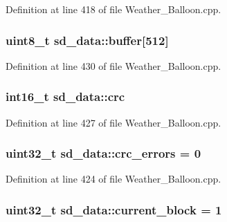 Definition at line 418 of file Weather\+\_\+\+Balloon.\+cpp.

\subsubsection[{\texorpdfstring{buffer}{buffer}}]{\setlength{\rightskip}{0pt plus 5cm}uint8\+\_\+t sd\+\_\+data\+::buffer\mbox{[}512\mbox{]}}\hypertarget{structsd__data_ab3590a9446d96dd2d7527a8b69d6a7e4}{}\label{structsd__data_ab3590a9446d96dd2d7527a8b69d6a7e4}


Definition at line 430 of file Weather\+\_\+\+Balloon.\+cpp.

\subsubsection[{\texorpdfstring{crc}{crc}}]{\setlength{\rightskip}{0pt plus 5cm}int16\+\_\+t sd\+\_\+data\+::crc}\hypertarget{structsd__data_a3e3831d75c0cbbc4f4bc83f20c57c4d7}{}\label{structsd__data_a3e3831d75c0cbbc4f4bc83f20c57c4d7}


Definition at line 427 of file Weather\+\_\+\+Balloon.\+cpp.

\subsubsection[{\texorpdfstring{crc\+\_\+errors}{crc\_errors}}]{\setlength{\rightskip}{0pt plus 5cm}uint32\+\_\+t sd\+\_\+data\+::crc\+\_\+errors = 0}\hypertarget{structsd__data_a803add843065a08b411291e34786dac3}{}\label{structsd__data_a803add843065a08b411291e34786dac3}


Definition at line 424 of file Weather\+\_\+\+Balloon.\+cpp.

\subsubsection[{\texorpdfstring{current\+\_\+block}{current\_block}}]{\setlength{\rightskip}{0pt plus 5cm}uint32\+\_\+t sd\+\_\+data\+::current\+\_\+block = 1}\hypertarget{structsd__data_a2d9191a0c849f5ee3b3714159dbd065d}{}\label{structsd__data_a2d9191a0c849f5ee3b3714159dbd065d}


